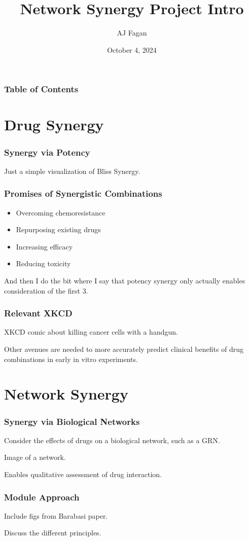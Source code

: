 \documentclass{beamer}
\author{AJ Fagan}
\title{Network Synergy Project Intro}
\date{October 4, 2024}
\begin{document}
\frame{\titlepage}


\begin{frame}
  \frametitle{Table of Contents}
  \tableofcontents
\end{frame}

\section{Drug Synergy}

\begin{frame}
  \frametitle{Synergy via Potency}
  Just a simple visualization of Bliss Synergy.
\end{frame}

\begin{frame}
  \frametitle{Promises of Synergistic Combinations}
  \begin{itemize}
    \item Overcoming chemoresistance
    \item Repurposing existing drugs
    \item Increasing efficacy
    \item Reducing toxicity
  \end{itemize}

  And then I do the bit where I say that potency synergy only actually enables consideration of the first 3.
\end{frame}

\begin{frame}
  \frametitle{Relevant XKCD}
  XKCD comic about killing cancer cells with a handgun.

  Other avenues are needed to more accurately predict clinical benefits of drug combinations in early in vitro experiments.
\end{frame}


\section{Network Synergy}

\begin{frame}
  \frametitle{Synergy via Biological Networks}
  Consider the effects of drugs on a biological network, such as a GRN.

  Image of a network.

  Enables qualitative assessment of drug interaction.
\end{frame}

\begin{frame}
  \frametitle{Module Approach}
  Include figs from Barabasi paper.

  Discuss the different principles.
\end{frame}
\end{document}
